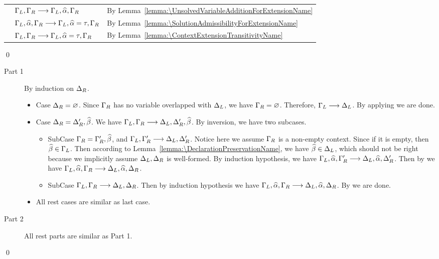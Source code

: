 \mbox{} %
\begin{longtable}[l]{lll}
  & $\Gamma_L, \Gamma_R \longrightarrow \Gamma_L, \widehat{\alpha}, \Gamma_R $ & By
  Lemma~\ref{lemma:\UnsolvedVariableAdditionForExtensionName} \\
  & $\Gamma_L, \widehat{\alpha}, \Gamma_R \longrightarrow \Gamma_L, \widehat{\alpha} = \tau, \Gamma_R $ & By
  Lemma~\ref{lemma:\SolutionAdmissibilityForExtensionName} \\
  & $\Gamma_L, \Gamma_R \longrightarrow \Gamma_L, \widehat{\alpha} = \tau, \Gamma_R$ &
  By Lemma~\ref{lemma:\ContextExtensionTransitivityName}
\end{longtable}
\qed

\begin{lemma}[\ParallelAdmissibilityName]\leavevmode
  \label{lemma:\ParallelAdmissibilityName}
  \ParallelAdmissibilityBody
\end{lemma}
\proof

\begin{description}
  \item [Part 1] By induction on $\Delta_R$.
    \begin{itemize}
    \item Case $\Delta_R = \varnothing$.
      Since $\Gamma_R$ has no variable overlapped with $\Delta_L$,
      we have $\Gamma_R = \varnothing$.
      Therefore, $\Gamma_L \longrightarrow \Delta_L$.
      By applying  we are done.
    \item Case $\Delta_R = \Delta_R', \widehat{\beta}$.
      We have $\Gamma_L, \Gamma_R \longrightarrow \Delta_L, \Delta_R', \widehat{\beta}$.
      By inversion, we have two subcases.
      \begin{itemize}
      \item SubCase $\Gamma_R = \Gamma_R', \widehat{\beta}$,
        and $\Gamma_L, \Gamma_R' \longrightarrow \Delta_L, \Delta_R'$.
        Notice here we assume $\Gamma_R$ is a non-empty context.
        Since if it is empty, then $\widehat{\beta} \in \Gamma_L$.
        Then according to Lemma~\ref{lemma:\DeclarationPreservationName},
        we have $\widehat{\beta} \in \Delta_L$, which should not be right because we
        implicitly assume $\Delta_L, \Delta_R$ is well-formed.
        By induction hypothesis,
        we have $\Gamma_L, \widehat{\alpha}, \Gamma_R' \longrightarrow \Delta_L, \widehat{\alpha}, \Delta_R'$.
        Then by 
        we have $\Gamma_L, \widehat{\alpha}, \Gamma_R \longrightarrow \Delta_L, \widehat{\alpha}, \Delta_R$.
      \item SubCase $\Gamma_L, \Gamma_R \longrightarrow \Delta_L, \Delta_R$.
        Then by induction hypothesis we have
        $\Gamma_L, \widehat{\alpha}, \Gamma_R \longrightarrow \Delta_L, \widehat{\alpha}, \Delta_R$.
        By  we are done.
      \end{itemize}
    \item All rest cases are similar as last case.
    \end{itemize}
  \item [Part 2] All rest parts are similar as Part 1.
\end{description}
\qed

